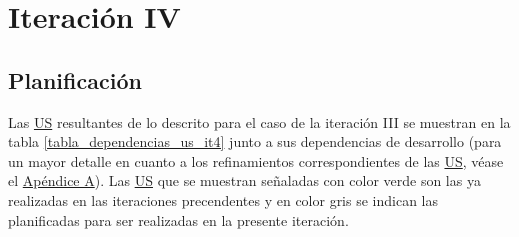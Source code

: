 \documentclass[a4paper, 12pt,twoside]{report}  %
\numberwithin{equation}{subsection} %
\begin{document}
\section{Iteración IV}
\subsection{Planificación}
Las \hyperlink{US}{US} resultantes de lo descrito para el caso de la iteración III se muestran en la tabla \ref{tabla_dependencias_us_it4} junto a sus dependencias de desarrollo (para un mayor detalle en cuanto a los refinamientos correspondientes de las \hyperlink{US}{US}, véase el \hyperlink{apendice_a}{Apéndice A}). Las \hyperlink{US}{US} que se muestran señaladas con color verde son las ya realizadas en las iteraciones precendentes y en color gris se indican las planificadas para ser realizadas en la presente iteración.
\end{document}

